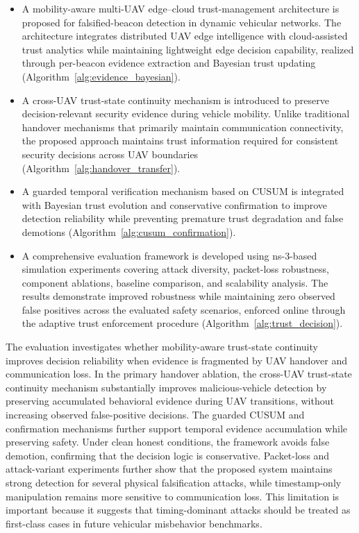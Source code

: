 \documentclass[journal]{IEEEtran}
\begin{document}
\begin{itemize}

\item A mobility-aware multi-UAV edge--cloud trust-management architecture
is proposed for falsified-beacon detection in dynamic vehicular networks.
The architecture integrates distributed UAV edge intelligence with
cloud-assisted trust analytics while maintaining lightweight edge decision
capability, realized through per-beacon evidence extraction and Bayesian
trust updating (Algorithm~\ref{alg:evidence_bayesian}).

\item A cross-UAV trust-state continuity mechanism is introduced to preserve
decision-relevant security evidence during vehicle mobility. Unlike
traditional handover mechanisms that primarily maintain communication
connectivity, the proposed approach maintains trust information required for
consistent security decisions across UAV boundaries
(Algorithm~\ref{alg:handover_transfer}).

\item A guarded temporal verification mechanism based on CUSUM is integrated
with Bayesian trust evolution and conservative confirmation to improve
detection reliability while preventing premature trust degradation and false
demotions (Algorithm~\ref{alg:cusum_confirmation}).

\item A comprehensive evaluation framework is developed using ns-3-based
simulation experiments covering attack diversity, packet-loss robustness,
component ablations, baseline comparison, and scalability analysis. The
results demonstrate improved robustness while maintaining zero observed
false positives across the evaluated safety scenarios, enforced online
through the adaptive trust enforcement procedure (Algorithm~\ref{alg:trust_decision}).

\end{itemize}

The evaluation investigates whether mobility-aware trust-state continuity improves decision reliability when evidence is fragmented by UAV handover and communication loss. In the primary handover ablation, the cross-UAV trust-state continuity mechanism substantially improves malicious-vehicle detection by preserving accumulated behavioral evidence during UAV transitions, without increasing observed false-positive decisions. The guarded CUSUM and confirmation mechanisms further support temporal evidence accumulation while preserving safety. Under clean honest conditions, the framework avoids false demotion, confirming that the decision logic is conservative. Packet-loss and attack-variant experiments further show that the proposed system maintains strong detection for several physical falsification attacks, while timestamp-only manipulation remains more sensitive to communication loss. This limitation is important because it suggests that timing-dominant attacks should be treated as first-class cases in future vehicular misbehavior benchmarks.
\end{document}
